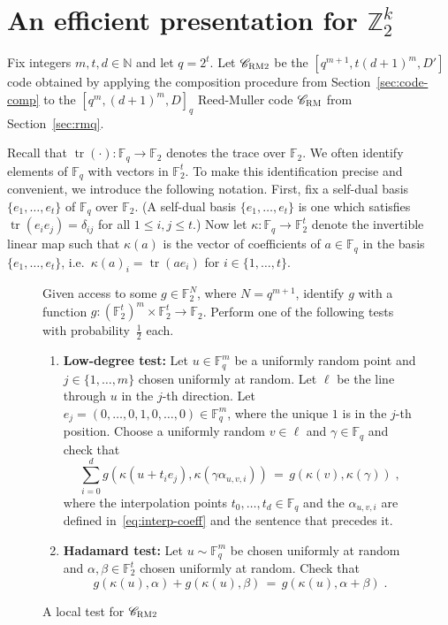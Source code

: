 \documentclass[11pt]{article}
\theoremstyle{definition}
\newcommand{\code}{\mathscr{C}}
\newcommand{\N}{\ensuremath{\mathbb{N}}}
\newcommand{\F}{\ensuremath{\mathbb{F}}}
\newcommand{\Z}{\ensuremath{\mathbb{Z}}}
\newcommand{\RM}{\ensuremath{\textsc{RM}}}
\newcommand{\bRM}{\ensuremath{\textsc{RM2}}}
\DeclareMathOperator{\tr}{tr}
\newenvironment{gamespec}{
  \begin{mdframed}[style=figstyle]}{
  \end{mdframed}}
\begin{document}
\section{An efficient presentation for $\Z_2^k$}
\label{sec:eff-z2k}

Fix integers $m,t,d \in \N$ and let $q=2^t$. Let $\code_{\bRM}$ be the $[q^{m+1},t(d+1)^m,D']$ code obtained by applying the composition procedure from Section~\ref{sec:code-comp} to the $[q^m,(d+1)^m,D]_q$ Reed-Muller code $\code_\RM$ from Section~\ref{sec:rmq}. 

Recall that $\tr(\cdot):\F_q\to\F_2$ denotes the trace over $\F_2$. We often identify elements of $\F_q$ with vectors in $\F_2^t$. To make this identification precise and convenient, we introduce the following notation. First, fix a  self-dual basis $\{e_1,\ldots,e_t\}$  of $\F_q$ over $\F_2$. (A self-dual basis $\{e_1,\ldots,e_t\}$ is one which satisfies $\tr(e_ie_j)=\delta_{ij}$ for all $1\leq i,j\leq t$.)
Now let $\kappa: \F_q \to \F_2^t$ denote the invertible linear map such that $\kappa(a)$ is the vector of coefficients of $a\in \F_q$ in the basis $\{e_1,\ldots,e_t\}$, i.e.\ $\kappa(a)_i=\tr(ae_i)$ for $i\in\{1,\ldots,t\}$. 


\begin{figure}[!htbp]
  \centering
  \begin{gamespec}
Given access to some $g\in \F_2^{N}$, where $N=q^{m+1}$, identify $g$ with a function $g:(\F_2^t)^m \times \F_2^t \to \F_2$. Perform one of the following tests with probability~$\tfrac{1}{2}$ each. 
\begin{enumerate}
	\item \textbf{Low-degree test:}
		Let $u \in \F_q^m$ be a uniformly random point and $j\in \{1,\ldots,m\}$ chosen uniformly at random. Let $\ell$ be the line through $u$ in the $j$-th direction. Let $e_j=(0,\ldots,0,1,0,\ldots,0)\in \F_q^m$, where the unique $1$ is in the $j$-th position. Choose a uniformly random $v\in \ell$ and $\gamma\in \F_q$ and check that 
		\[\sum_{i=0}^d g(\kappa(u+t_i e_j),\kappa(\gamma \alpha_{u,v,i})) \,=\, g(\kappa(v),\kappa(\gamma))\;,\]
		where the interpolation points $t_0,\ldots,t_d \in \F_q$ and the $\alpha_{u,v,i}$ are defined in~\eqref{eq:interp-coeff} and the sentence that precedes it.
	\item \textbf{Hadamard test:} Let $u\sim\F_q^m$ be chosen uniformly at random and $\alpha,\beta\in \F_2^t$ chosen uniformly at random. Check that 
	\[g(\kappa(u),\alpha)+g(\kappa(u),\beta)\,=\,g(\kappa(u),\alpha+\beta)\;.\] 	
    \end{enumerate}
  \end{gamespec}
  \caption{A local test for $\code_{\bRM}$}
  \label{fig:bRM-tester}
\end{figure}
\end{document}
